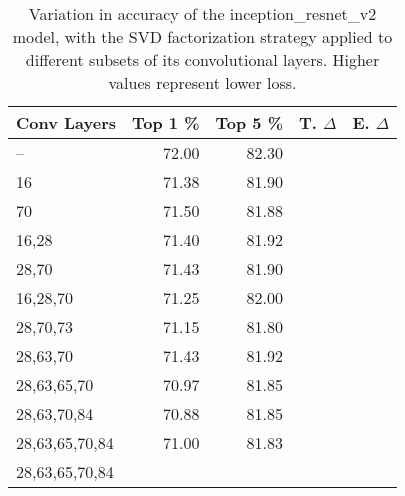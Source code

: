 \begin{table}
\centering
\begin{tabular}{|l|r|r|r|r|}
\hline
Conv Layers & Top 1 \% & Top 5 \% & T. $\Delta$ & E. $\Delta$ \\\hline
-- & 72.00 & 82.30 &  & \\\hline
16 & 71.38 & 81.90 &  &  \\\hline
70 & 71.50 & 81.88 &  &  \\\hline
16,28 & 71.40 & 81.92 &  &  \\\hline
28,70 & 71.43 & 81.90 &  &  \\\hline
16,28,70 & 71.25 & 82.00 &  &  \\\hline
28,70,73 & 71.15 & 81.80 &  &  \\\hline
28,63,70 & 71.43 & 81.92 &  &  \\\hline
28,63,65,70 & 70.97 & 81.85 &  &  \\\hline
28,63,70,84 & 70.88 & 81.85 &  &  \\\hline
28,63,65,70,84 & 71.00 & 81.83 &  &  \\\hline
28,63,65,70,84 &  &  &  &  \\\hline
\end{tabular}
\caption{Variation in accuracy of the inception\_resnet\_v2 model, with the SVD factorization strategy applied to different subsets of its convolutional layers. Higher values represent lower loss.}
\label{inception_resnet_v2-accuracy}
\end{table}
